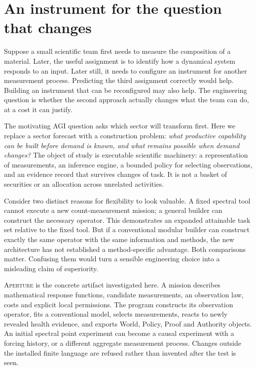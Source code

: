 \documentclass[11pt,letterpaper]{article}
\newcommand{\ap}{\textsc{Aperture}}
\begin{document}
\section{An instrument for the question that changes}

Suppose a small scientific team first needs to measure the composition of a material. Later, the useful assignment is to identify how a dynamical system responds to an input. Later still, it needs to configure an instrument for another measurement process. Predicting the third assignment correctly would help. Building an instrument that can be reconfigured may also help. The engineering question is whether the second approach actually changes what the team can do, at a cost it can justify.

The motivating AGI question asks which sector will transform first. Here we replace a sector forecast with a construction problem: \emph{what productive capability can be built before demand is known, and what remains possible when demand changes?} The object of study is executable scientific machinery: a representation of measurements, an inference engine, a bounded policy for selecting observations, and an evidence record that survives changes of task. It is not a basket of securities or an allocation across unrelated activities.

Consider two distinct reasons for flexibility to look valuable. A fixed spectral tool cannot execute a new count-measurement mission; a general builder can construct the necessary operator. This demonstrates an expanded attainable task set relative to the fixed tool. But if a conventional modular builder can construct exactly the same operator with the same information and methods, the new architecture has not established a method-specific advantage. Both comparisons matter. Confusing them would turn a sensible engineering choice into a misleading claim of superiority.

\ap{} is the concrete artifact investigated here. A mission describes mathematical response functions, candidate measurements, an observation law, costs and explicit local permissions. The program constructs its observation operator, fits a conventional model, selects measurements, reacts to newly revealed health evidence, and exports World, Policy, Proof and Authority objects. An initial spectral point experiment can become a causal experiment with a forcing history, or a different aggregate measurement process. Changes outside the installed finite language are refused rather than invented after the test is seen.
\end{document}
